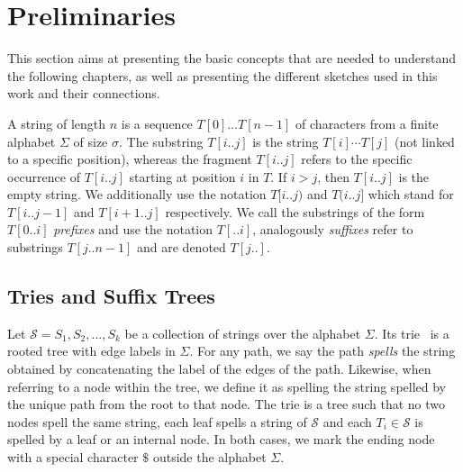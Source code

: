\section{Preliminaries}\label{sec:prelim}

This section aims at presenting the basic concepts that are needed to understand the following chapters, as well as presenting the different sketches used in this work and their connections.

A string of length $n$ is a sequence $T[0] \dots T[n-1]$ of characters from a finite alphabet $\Sigma$ of size $\sigma$. The substring $T[i..j]$ is the string $T[i] \cdots T[j]$ (not linked to a specific position), whereas the fragment $T[i..j]$ refers to the specific occurrence of $T[i..j]$ starting at position $i$ in $T$. If $i > j$, then $T[i..j]$ is the empty string. We additionally use the notation $T[i..j)$ and $T(i..j]$ which stand for $T[i..j-1]$ and $T[i+1..j]$ respectively. We call the substrings of the form $T[0..i]$ \emph{prefixes}  and use the notation $T[..i]$, analogously \emph{suffixes} refer to substrings $T[j..n-1]$ and are denoted $T[j..]$.

\subsection{Tries and Suffix Trees}\label{sec:prelim:tries}
Let $\mathcal{S} = {S_1,S_2, ..., S_k}$ be a collection of strings over the alphabet $\Sigma$. Its trie~\cite{thue1912gegenseitige,de1959file,fredkin1960trie} is a rooted tree with edge labels in $\Sigma$.
For any path, we say the path \emph{spells} the string obtained by concatenating the label of the edges of the path.
Likewise, when referring to a node within the tree, we define it as spelling the string spelled by the unique path from the root to that node.
The trie is a tree such that no two nodes spell the same string, each leaf spells a string of $\mathcal{S}$ and each $T_i \in \mathcal{S}$ is spelled by a leaf or an internal node. In both cases, we mark the ending node with a special character $\$$ outside the alphabet $\Sigma$.

